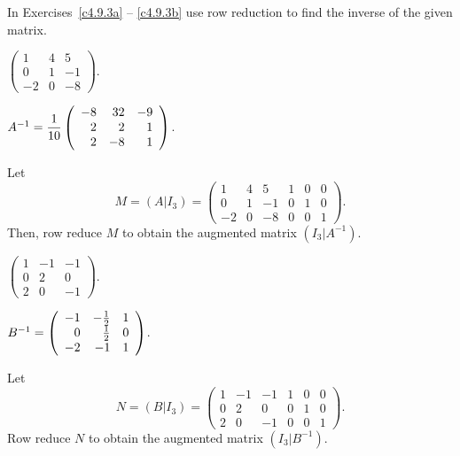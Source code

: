 \documentclass{ximera}
\begin{document}
\noindent In Exercises~\ref{c4.9.3a} -- \ref{c4.9.3b} use row reduction
to find the inverse of the given matrix.
\begin{exercise} \label{c4.9.3a}
$\left(\begin{array}{rrr} 1 & 4 & 5\\ 0 & 1 & -1\\ -2 & 0 & -8
\end{array}\right)$.

\begin{solution}
\ans
$A^{-1} = \displaystyle\frac{1}{10}\left(\begin{array}{rrr} -8 & 32 & -9 \\ 2 & 2 & 1 \\ 2 & -8 & 1\end{array}\right)$.

\soln Let
\[
M = (A|I_3) = \left(\begin{array}{rrr|rrr} 1 & 4 & 5 & 1 & 0 & 0 \\
0 & 1 & -1 & 0 & 1 & 0 \\
-2 & 0 & -8 & 0 & 0 & 1 \end{array}\right).
\]
Then, row reduce $M$ to obtain the augmented matrix $(I_3|A^{-1})$.

\end{solution}
\end{exercise}
\begin{exercise} \label{c4.9.3b}
$\left(\begin{array}{rrr} 1 & -1 & -1\\ 0 & 2 & 0\\ 2 & 0 & -1
\end{array}\right)$.

\begin{solution}
\ans
$B^{-1} = \left(\begin{array}{rrr} -1 & -\frac{1}{2} & 1 \\ 0 & \frac{1}{2} & 0 \\ -2 & -1 & 1\end{array}\right)$.

\soln Let
\[
N = (B|I_3) = \left(\begin{array}{rrr|rrr} 1 & -1 & -1 & 1 & 0 & 0 \\
0 & 2 & 0 & 0 & 1 & 0 \\ 2 & 0 & -1 & 0 & 0 & 1 \end{array}\right).
\]
Row reduce $N$ to obtain the augmented matrix $(I_3|B^{-1})$.

\end{solution}
\end{exercise}
\end{document}
